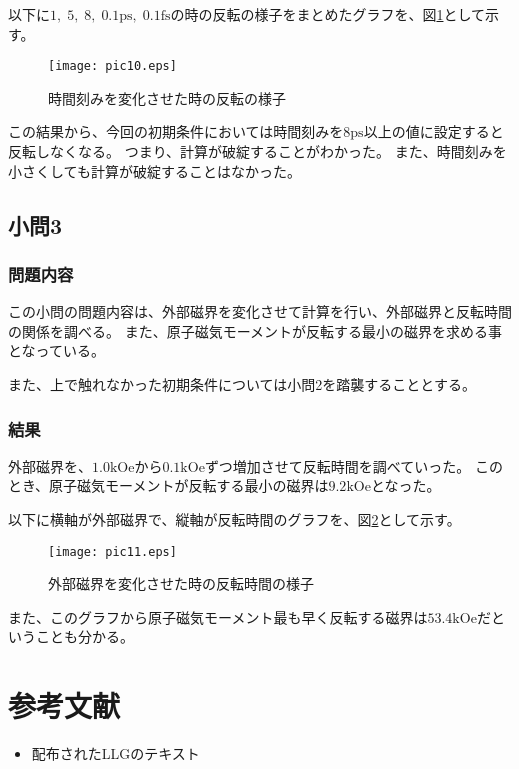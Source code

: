 \documentclass{jsarticle}
\begin{document}
以下に$1,\;5,\;8,\;0.1\mathrm{ps},\;0.1\mathrm{fs}$の時の反転の様子をまとめたグラフを、図\ref{fig07}として示す。
\begin{figure}[H]
	\centering
	\texttt{[image: pic10.eps]}
	\caption{時間刻みを変化させた時の反転の様子}
	\label{fig07}
\end{figure}

この結果から、今回の初期条件においては時間刻みを$8\mathrm{ps}$以上の値に設定すると反転しなくなる。
つまり、計算が破綻することがわかった。
また、時間刻みを小さくしても計算が破綻することはなかった。

\subsection{小問3}
\subsubsection{問題内容}
この小問の問題内容は、外部磁界を変化させて計算を行い、外部磁界と反転時間の関係を調べる。
また、原子磁気モーメントが反転する最小の磁界を求める事となっている。

また、上で触れなかった初期条件については小問2を踏襲することとする。

\subsubsection{結果}
外部磁界を、$1.0\mathrm{kOe}$から$0.1\mathrm{kOe}$ずつ増加させて反転時間を調べていった。
このとき、原子磁気モーメントが反転する最小の磁界は$9.2\mathrm{kOe}$となった。

以下に横軸が外部磁界で、縦軸が反転時間のグラフを、図\ref{fig08}として示す。
\begin{figure}[H]
	\centering
	\texttt{[image: pic11.eps]}
	\caption{外部磁界を変化させた時の反転時間の様子}
	\label{fig08}
\end{figure}

また、このグラフから原子磁気モーメント最も早く反転する磁界は$53.4\mathrm{kOe}$だということも分かる。

\section{参考文献}

\begin{itemize}
  \item 配布されたLLGのテキスト
\end{itemize}
\end{document}
